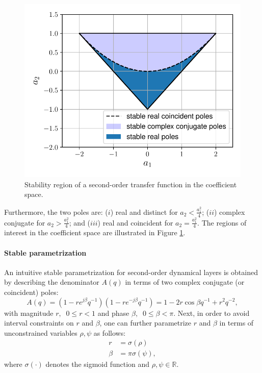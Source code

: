 \documentclass{article}
\newcommand{\q}{q} %
\newcommand{\A}{A} %
\begin{document}
\begin{figure}[h]
	\begin{center}
		
		\includegraphics[width=.4\textwidth]
		{fig/stable_2ndorder.pdf}
	\end{center}
	\caption{Stability region of a second-order transfer function in the coefficient space.}
	\label{fig:stable_2ndorder}
\end{figure} 

Furthermore, the two poles are: ($i$) real and distinct for $a_2 < \frac{a_1^2}{4}$; ($ii$) complex conjugate for $a_2 > \frac{a_1^2}{4}$; and ($iii$) 
real and coincident for $a_2 = \frac{a_1^2}{4}$. The regions of interest in the coefficient space are illustrated in Figure \ref{fig:stable_2ndorder}.

\paragraph{Stable parametrization} 
An intuitive stable parametrization for second-order dynamical layers is obtained by describing the denominator $\A(\q)$ in terms of two complex conjugate (or coincident) poles:
\begin{equation*}
\A(\q) = (1 - r e^{j\beta} q^{-1}) ( 1 - r e^{-j\beta}q^{-1}) = 1 - 2r\cos\beta \q^{-1} + r^2 \q^{-2},
\end{equation*}
with magnitude $r,\;\; 0 \leq r < 1$ and phase $\beta,\;\; 0 \leq \beta < \pi$. 
Next, in order to avoid interval constraints on $r$ and $\beta$, one can further parametrize $r$ and $\beta$
in terms of unconstrained variables $\rho, \psi$ as follows: %
\begin{subequations}
	\label{eq:SOS_stable_coord}
	\begin{align*}
	r      &= \sigma(\rho)\\
	\beta  &= \pi \sigma(\psi),
	\end{align*}
\end{subequations}
where $\sigma(\cdot)$ denotes the sigmoid function and  $\rho, \psi\in \mathbb{R}$. 
\end{document}
